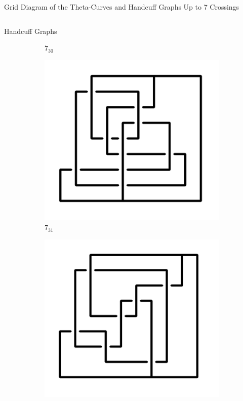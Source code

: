 \documentclass[final]{beamer}
\begin{document}
\begin{frame}[t]
\begin{alertblock}{Grid Diagram of the Theta-Curves and Handcuff Graphs Up to 7 Crossings}
\begin{columns}[t]
\begin{column}{0.5\textwidth}
\begin{alertblock}{Handcuff Graphs}
\begin{figure}
\begin{subfigure}{0.075\textwidth}
    \caption{$7_{30}$} 
    \end{subfigure}
    \begin{subfigure}{0.075\textwidth}
    \includegraphics[width=\columnwidth]{../Midterm_Poster/grid_diagram/handcuff_7_31.png}
    \caption{$7_{31}$} 
    \end{subfigure}
    \begin{subfigure}{0.075\textwidth}
    \includegraphics[width=\columnwidth]{../Midterm_Poster/grid_diagram/handcuff_7_32.png}

\end{subfigure}
\end{figure}
\end{alertblock}
\end{column}
\end{columns}
\end{alertblock}
\end{frame}
\end{document}
